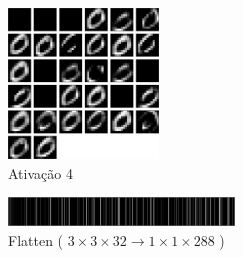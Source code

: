 \documentclass[tikz,10pt]{beamer}
\begin{document}
\begin{frame}
\begin{columns}
		\begin{column}{0.66\textwidth}
			\begin{figure}
				\includegraphics[height=4cm]{images/resultados/network_1/input_1_layer_activation_4}
				\caption{Ativação 4}
			\end{figure}%
			\begin{figure}
				\includegraphics[width=6cm]{images/resultados/network_1/input_1_layer_flatten_1}%
				\caption{Flatten \small{ ( $3 \times 3 \times 32 \rightarrow 1 \times 1 \times 288$ )} }			
			\end{figure}%
		\end{column}	
	\end{columns}
	
\end{frame}
\end{document}
